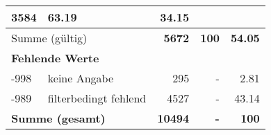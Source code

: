 \begin{longtable}{lXrrr}
       \num{3584} &
       \num[round-mode=places,round-precision=2]{63.19} &
         \num[round-mode=places,round-precision=2]{34.15} \\
     \midrule
     \multicolumn{2}{l}{Summe (gültig)} &
       \textbf{\num{5672}} &
     \textbf{\num{100}} &
       \textbf{\num[round-mode=places,round-precision=2]{54.05}} \\
     \multicolumn{5}{l}{\textbf{Fehlende Werte}}\\
       -998 &
       keine Angabe &
         \num{295} &
        - &
         \num[round-mode=places,round-precision=2]{2.81} \\
       -989 &
       filterbedingt fehlend &
         \num{4527} &
        - &
         \num[round-mode=places,round-precision=2]{43.14} \\
     \midrule
     \multicolumn{2}{l}{\textbf{Summe (gesamt)}} &
          \textbf{\num{10494}} &
        \textbf{-} &
        \textbf{\num{100}} \\
     \bottomrule
     \end{longtable}
     
